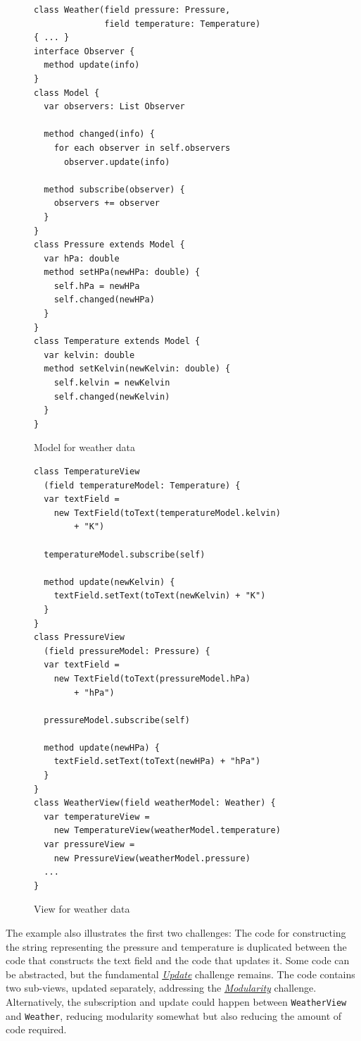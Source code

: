 \documentclass[sigplan,screen]{acmart}
\begin{document}
\begin{figure}[tb]
\begin{verbatim}
class Weather(field pressure: Pressure,
              field temperature: Temperature)
{ ... }
interface Observer {
  method update(info)
}
class Model {
  var observers: List Observer

  method changed(info) {
    for each observer in self.observers
      observer.update(info)

  method subscribe(observer) {
    observers += observer
  }
}
class Pressure extends Model {
  var hPa: double
  method setHPa(newHPa: double) {
    self.hPa = newHPa
    self.changed(newHPa)
  }
}
class Temperature extends Model {
  var kelvin: double
  method setKelvin(newKelvin: double) {
    self.kelvin = newKelvin
    self.changed(newKelvin)
  }
}
\end{verbatim}
  \vspace*{-3ex}
  \caption{Model for weather data}
  \label{fig:weather-model}
\end{figure}

\begin{figure}[tb]
\begin{verbatim}
class TemperatureView
  (field temperatureModel: Temperature) {
  var textField =
    new TextField(toText(temperatureModel.kelvin)
        + "K")

  temperatureModel.subscribe(self)

  method update(newKelvin) {
    textField.setText(toText(newKelvin) + "K")
  }
}
class PressureView
  (field pressureModel: Pressure) {
  var textField =
    new TextField(toText(pressureModel.hPa)
        + "hPa")

  pressureModel.subscribe(self)

  method update(newHPa) {
    textField.setText(toText(newHPa) + "hPa")
  }
}
class WeatherView(field weatherModel: Weather) {
  var temperatureView =
    new TemperatureView(weatherModel.temperature)
  var pressureView =
    new PressureView(weatherModel.pressure)
  ...
}
\end{verbatim}
  \vspace*{-2ex}
  \caption{View for weather data}
  \label{fig:weather-view}
\end{figure}

The example also illustrates the first two challenges:
The code for constructing the string representing the pressure
and temperature is duplicated between the code that constructs the
text field and the code that updates it.  Some code can be abstracted,
but the fundamental
\hyperlink{challenge:update}{\textit{Update}} challenge remains.
The code contains two sub-views, updated separately, addressing the
\hyperlink{challenge:modularity}{\textit{Modularity}} challenge.
Alternatively, the subscription and update could happen between
\texttt{WeatherView} and \texttt{Weather}, reducing modularity
somewhat but also reducing the amount of code required.
\end{document}
